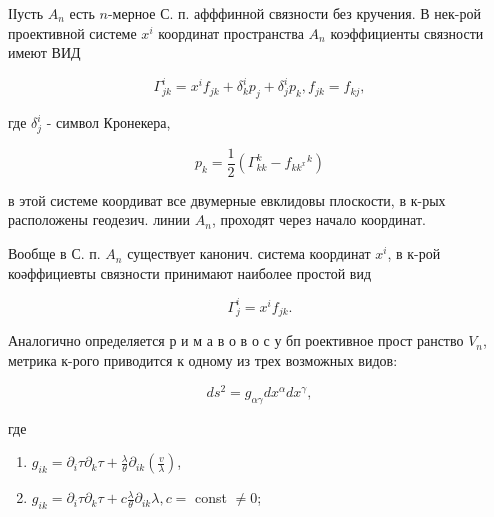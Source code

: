 \documentclass[10pt]{article}
\begin{document}
ІІусть $A_{n}$ есть $n$-мерное С. п. афффинной связности без кручения. В нек-рой проективной системе $x^{i}$ координат пространства $A_{n}$ коэффициенты связности имеют ВИД



\[

\Gamma_{j k}^{i}=x^{i} f_{j k}+\delta_{k}^{i} p_{j}+\delta_{j}^{i} p_{k}, f_{j k}=f_{k j},

\]



где $\delta_{j}^{i}$ - символ Кронекера,



\[

p_{k}=\frac{1}{2}\left(\Gamma_{k k}^{k}-f_{k k^{x}}{ }^{k}\right)

\]



в этой системе коордиват все двумерные евклидовы плоскости, в к-рых расположены геодезич. линии $A_{n}$, проходят через начало координат.



Вообще в С. п. $A_{n}$ существует канонич. система координат $x^{i}$, в к-рой коәффициевты связности принимают наиболее простой вид



\[

\Gamma_{j}^{i}=x^{i} f_{j k} .

\]



Аналогично определяется р и м а в о в о с у бп роективное прост ранство $V_{n}$, метрика к-рого приводится к одному из трех возможных видов:



\[

d s^{2}=g_{\alpha \gamma} d x^{\alpha} d x^{\gamma},

\]



где



\begin{enumerate}

  \item $g_{i k}=\partial_{i} \tau \partial_{k} \tau+\frac{\lambda}{\theta} \partial_{i k}\left(\frac{v}{\lambda}\right)$,



  \item $g_{i k}=\partial_{i} \tau \partial_{k} \tau+c \frac{\lambda}{\theta} \partial_{i k} \lambda, c=$ const $\neq 0$;



\end{enumerate}
\end{document}
